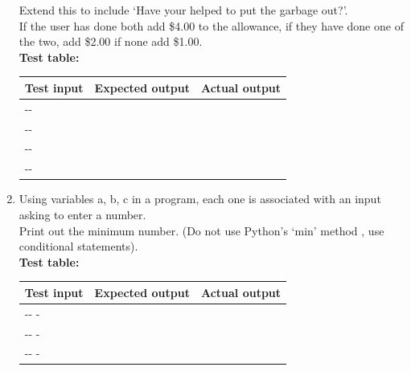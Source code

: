 \documentclass[a4paper,12pt]{article}
\begin{document}
\begin{enumerate}[label=\normalsize \alph*)~~~ , topsep=8pt,itemsep=25pt,partopsep=4pt, parsep=4pt, leftmargin = 0.5cm]
Extend this to include `Have your helped to put the garbage out?'.\\
 If the user has done both add \$4.00 to the allowance, if they have done one of the two, add \$2.00 if none add \$1.00.\\
 	\textbf{Test table:}\\
	\begin{tabular}{| p{5cm} | p{5cm} | p{5cm} |}\hline
	Test input& Expected output & Actual output\\\hline
	-\newline -&  &  \\\hline
	-\newline -&  &  \\\hline
		-\newline -&  &  \\\hline
			-\newline -&  &  \\\hline
\end{tabular}
\newpage
\item Using variables a, b, c in a program, each one is associated with an input asking to enter a number.\\
Print out the minimum number. (Do not use Python's `min' method , use conditional statements).\\
	\textbf{Test table:}\\
	\begin{tabular}{| p{5cm} | p{5cm} | p{5cm} |}\hline
	Test input& Expected output & Actual output\\\hline
	-\newline - \newline -&  &  \\\hline
	-\newline - \newline -&  &  \\\hline
		-\newline - \newline -&  &  \\\hline
\end{tabular}


\end{enumerate}
\end{document}
